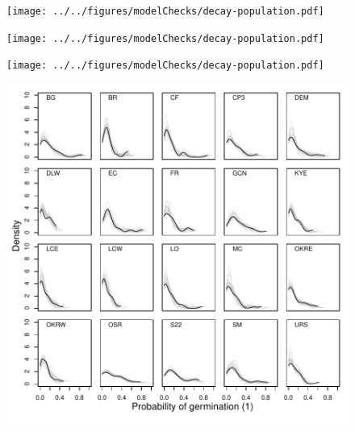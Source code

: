 \documentclass[12pt, oneside, titlepage]{article}   	%
\begin{document}
\clearpage
\newpage

\begin{figure}[!h]
   \centering
       \texttt{[image: ../../figures/modelChecks/decay-population.pdf]}  
 \label{fig:name}
\end{figure}


\begin{figure}[!h]
   \centering
       \texttt{[image: ../../figures/modelChecks/decay-population.pdf]}  
 \label{fig:name}
\end{figure}

\begin{figure}[!h]
   \centering
       \texttt{[image: ../../figures/modelChecks/decay-population.pdf]}  
 \label{fig:name}
\end{figure}



\begin{figure}[!h]
   \centering
       \includegraphics[page=1,width=1\textwidth]{../../figures/modelChecks/germination-population.pdf}  
 \label{fig:name}
\end{figure}
\end{document}
